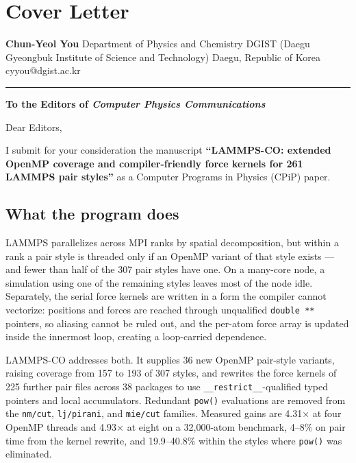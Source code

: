 \documentclass[
  11pt,
]{article}
\author{}
\date{}
\begin{document}
\section{Cover Letter}\label{cover-letter}

\textbf{Chun-Yeol You} Department of Physics and Chemistry DGIST (Daegu
Gyeongbuk Institute of Science and Technology) Daegu, Republic of Korea
cyyou@dgist.ac.kr

\begin{center}\rule{0.5\linewidth}{0.5pt}\end{center}

\textbf{To the Editors of \emph{Computer Physics Communications}}

Dear Editors,

I submit for your consideration the manuscript \textbf{``LAMMPS-CO:
extended OpenMP coverage and compiler-friendly force kernels for 261
LAMMPS pair styles''} as a Computer Programs in Physics (CPiP) paper.

\subsection{What the program does}\label{what-the-program-does}

LAMMPS parallelizes across MPI ranks by spatial decomposition, but
within a rank a pair style is threaded only if an OpenMP variant of that
style exists --- and fewer than half of the 307 pair styles have one. On
a many-core node, a simulation using one of the remaining styles leaves
most of the node idle. Separately, the serial force kernels are written
in a form the compiler cannot vectorize: positions and forces are
reached through unqualified \texttt{double\ **} pointers, so aliasing
cannot be ruled out, and the per-atom force array is updated inside the
innermost loop, creating a loop-carried dependence.

LAMMPS-CO addresses both. It supplies 36 new OpenMP pair-style variants,
raising coverage from 157 to 193 of 307 styles, and rewrites the force
kernels of 225 further pair files across 38 packages to use
\texttt{\_\_restrict\_\_}-qualified typed pointers and local
accumulators. Redundant \texttt{pow()} evaluations are removed from the
\texttt{nm/cut}, \texttt{lj/pirani}, and \texttt{mie/cut} families.
Measured gains are 4.31× at four OpenMP threads and 4.93× at eight on a
32,000-atom benchmark, 4--8\% on pair time from the kernel rewrite, and
19.9--40.8\% within the styles where \texttt{pow()} was eliminated.
\end{document}
